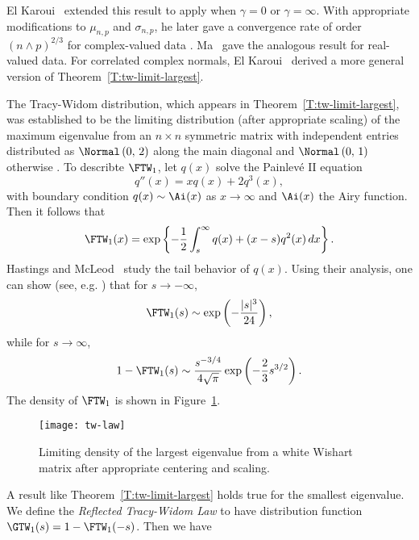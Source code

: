 \noindent
El Karoui~\cite{elkaroui2003lew} extended this result to apply when $\gamma = 0$ or $\gamma = \infty$.  With appropriate modifications to $\mu_{n,p}$ and $\sigma_{n,p}$, he later gave a convergence rate of order $(n \wedge p)^{2/3}$  for complex-valued data \cite{elkaroui2006mpt}.  Ma~\cite{ma2008atw} gave the analogous result for real-valued data.  For correlated complex normals, El Karoui~\cite{elkaroui2007twl} derived a more general version of Theorem~\ref{T:tw-limit-largest}.  

The Tracy-Widom distribution, which appears in Theorem~\ref{T:tw-limit-largest}, was  established to be the limiting distribution (after appropriate scaling) of the maximum eigenvalue from an $n \times n$ symmetric matrix with independent entries distributed as $\Normal\left( 0, \, 2 \right)$ along the main diagonal and $\Normal\left( 0, \, 1 \right)$ otherwise \cite{tracy1994lsd} \cite{tracy1996oas}.  To describte $\FTW_1$, let $q(x)$ solve the Painlev\'e II equation
\[
    q''(x) = x q(x) + 2 q^3(x),
\]
with boundary condition $q(x) \sim \Ai(x)$ as $x \to \infty$ and $\Ai(x)$ the Airy function.  Then it follows that
\[
    \FTW_1(x)
    =
    \exp \left\{
        -
        \frac{1}{2}
        \int_s^\infty
            q(x)
            +
            (x-s) q^2 (x)
            \,
            dx
    \right\}.
\]
Hastings and McLeod~\cite{hastings1980bvp} study the tail behavior of $q(x)$.  Using their analysis, one can show (see, e.g. \cite{perry2009mre}) that for $s \to -\infty$, 
\[
    \FTW_1(s)
    \sim
    \exp \left(
        -\frac{|s|^3}{24}
    \right),
\]
while for $s \to \infty$,
\[
    1 - \FTW_1(s)
    \sim
    \frac{ s^{-3/4} }
         { 4 \sqrt{ \pi } }
    \exp \left(
        -
        \frac{2}{3}
        s^{3/2}
    \right).
\]
The density of $\FTW_1$ is shown in Figure~\ref{F:tw-density}.

\begin{figure}
    \centering
    \texttt{[image: tw-law]}
    \caption{
        Limiting density of the largest eigenvalue from a white Wishart
        matrix after appropriate centering and scaling.
    }
    \label{F:tw-density}
\end{figure}

A result like Theorem~\ref{T:tw-limit-largest} holds true for the smallest eigenvalue.  We define the \emph{Reflected Tracy-Widom Law} to have distribution function $\GTW_1(s) = 1 - \FTW_1(-s)$.  Then we have 

